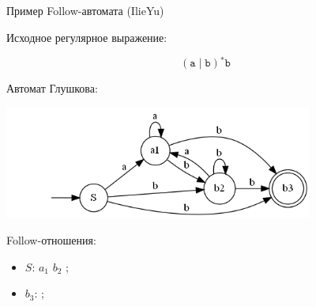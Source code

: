 \documentclass[mathserif]{beamer}
\def\alter{\ensuremath{\mathrel{\vert}}}%
\def\star{\ensuremath{^{*}}}%
\def\regexpstr#1{\mathtt{#1}}%
\begin{document}
\begin{frame}{Пример Follow-автомата (IlieYu)} {\vspace{-5pt}}
    \vspace{-5pt}
     {
        Исходное регулярное выражение:

        \[(\regexpstr{a}\alter \regexpstr{b})\star\regexpstr{b}\] %
    }
     {
        Автомат Глушкова:

        \includegraphics[width=4in, keepaspectratio]{follow1.png} %
    }
     {
        Follow-отношения:
        \begin{itemize}
            \item $S$: $a_{1}$ $b_{2}$ ; %
            \item $b_{3}$: ; %
        \end{itemize}
    }
\end{frame}

\end{document}
